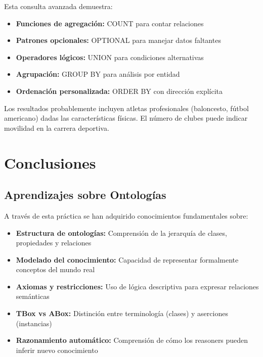 \documentclass[12pt,a4paper]{article}
\begin{document}
Esta consulta avanzada demuestra:

\begin{itemize}
    \item \textbf{Funciones de agregación:} COUNT para contar relaciones
    \item \textbf{Patrones opcionales:} OPTIONAL para manejar datos faltantes
    \item \textbf{Operadores lógicos:} UNION para condiciones alternativas
    \item \textbf{Agrupación:} GROUP BY para análisis por entidad
    \item \textbf{Ordenación personalizada:} ORDER BY con dirección explícita
\end{itemize}

Los resultados probablemente incluyen atletas profesionales (baloncesto, fútbol americano) dadas las características físicas. El número de clubes puede indicar movilidad en la carrera deportiva.

\section{Conclusiones}

\subsection{Aprendizajes sobre Ontologías}

A través de esta práctica se han adquirido conocimientos fundamentales sobre:

\begin{itemize}
    \item \textbf{Estructura de ontologías:} Comprensión de la jerarquía de clases, propiedades y relaciones
    \item \textbf{Modelado del conocimiento:} Capacidad de representar formalmente conceptos del mundo real
    \item \textbf{Axiomas y restricciones:} Uso de lógica descriptiva para expresar relaciones semánticas
    \item \textbf{TBox vs ABox:} Distinción entre terminología (clases) y aserciones (instancias)
    \item \textbf{Razonamiento automático:} Comprensión de cómo los reasoners pueden inferir nuevo conocimiento
\end{itemize}
\end{document}

